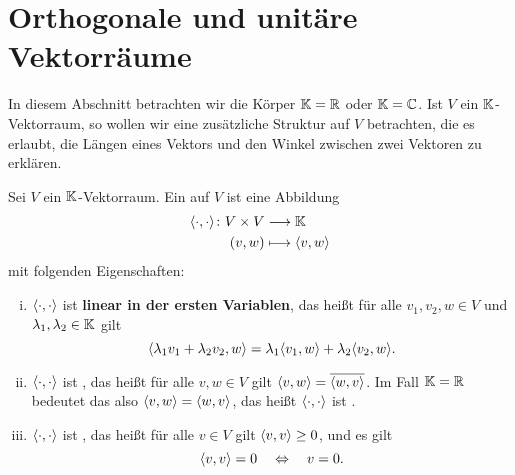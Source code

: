 \section{Orthogonale und unitäre Vektorräume}
\label{sec:2.3}

In diesem Abschnitt betrachten wir die Körper $\mathbb{K} = \mathbb{R}$ oder $\mathbb{K} = \mathbb{C}$.
Ist $V$ ein $\mathbb{K}$-Vektorraum, so wollen wir eine zusätzliche Struktur auf $V$ betrachten, die es erlaubt, die Längen eines Vektors und den Winkel zwischen zwei Vektoren zu erklären.

\begin{definition}[Skalarprodukt]
	\label{def:3.1}
	Sei $V$ ein $\mathbb{K}$-Vektorraum.
	Ein  auf $V$ ist eine Abbildung
	\begin{align*}
		\langle\cdot,\cdot\rangle \colon V \times V &\longrightarrow \mathbb{K} \\
		(v,w) &\longmapsto \langle v,w\rangle
	\end{align*}
	mit folgenden Eigenschaften:
	\begin{enumerate}[(i)]
		\item $\langle\cdot,\cdot\rangle$ ist \textbf{linear in der ersten Variablen}, das heißt für alle $v_1,v_2,w \in V$ und $\lambda_1,\lambda_2 \in \mathbb{K}$ gilt
		\[
			\sk{\lambda_1v_1+\lambda_2v_2,w} = \lambda_1 \sk{v_1,w} + \lambda_2 \sk{v_2,w}.
		\]
		\item $\langle\cdot,\cdot\rangle$ ist , das heißt für alle $v,w \in V$ gilt $\left\langle v,w\right\rangle = \overline{\left\langle w,v\right\rangle}$.
		Im Fall $\mathbb{K}=\mathbb{R}$ bedeutet das also $\left\langle v,w\right\rangle = \left\langle w,v\right\rangle$, das heißt $\langle\cdot,\cdot\rangle$ ist .
		\item  $\langle\cdot,\cdot\rangle$ ist , das heißt für alle $v \in V$ gilt $\left\langle v,v\right\rangle \geq 0$, und es gilt
		\[
			\left\langle v,v\right\rangle = 0 \quad \Leftrightarrow \quad v = 0.
		\]
	\end{enumerate}
\end{definition}

